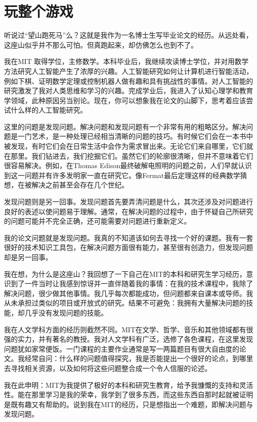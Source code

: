 \chapter{玩整个游戏}
听说过“望山跑死马”么？这就是我作为一名博士生写毕业论文的经历。从远处看，这座山似乎并不那么可怕。但真跑起来，却仿佛怎么也到不了。

我在MIT 取得学位，主修数学。本科毕业后，我继续攻读博士学位，并对用数学方法研究人工智能产生了浓厚的兴趣。人工智能研究如何让计算机进行智能活动，例如下棋、证明数学定理或控制机器人做有趣和具有挑战性的事情。对人工智能的研究激发了我对人类思维和学习的兴趣。完成学业后，我进入了认知心理学和教育学领域，此种原因另当别论。现在，你可以想象我在论文的山脚下，思考着应该尝试什么样的人工智能研究。

这里的问题是发现问题。解决问题和发现问题有一个非常有用的粗略区分。解决问题是一门艺术，是一种处理已经相当清晰的问题的技巧。有时候它们会在一本书中被发现，有时它们会在日常生活中会作为需求冒出来。无论它们来自哪里，它们就在那里。我们钻进去，我们挖掘它们。虽然它们的轮廓很清晰，但并不意味着它们很容易解决。例如，在Thomas Edison最终破解电照明的问题之前，人们早就认识到这一问题并有许多发明家一直在研究它。像Fermat最后定理这样的经典数学猜想，在被解决之前甚至会存在几个世纪。

发现问题则是另一回事。发现问题首先要弄清问题是什么，其次还涉及对问题进行良好的表述以使问题易于理解。通常，在解决问题的过程中，由于怀疑自己所研究的问题可能并不完全正确，还可能需要对问题进行重新定义。

我的论文问题就是发现问题。我真的不知道该如何去寻找一个好的课题。我有一套很好的技术知识工具包，在解决问题方面很有能力，甚至很有创造力，但发现问题却是另一回事。

我在想，为什么是这座山？我回想了一下自己在MIT的本科和研究生学习经历，意识到了一件当时让我感到惊讶并一直伴随着我的事情：在我的技术课程中，我除了解决问题，很少做其他事情。我几乎每次都能成功，但问题都来自课本或导师。我从未承担过类似的项目或开放式的研究。结果不可避免：我拥有大量解决问题的技能，却几乎没有发现问题的技能。

我在人文学科方面的经历则截然不同。MIT在文学、哲学、音乐和其他领域都有很强的实力，并有著名的教授。我对人文学科有广泛，选修了各色课程，在这里发现问题犹如家常便饭。一门课程的主要作业通常是写一两篇题目有很大自由度的论文。我经常自问：什么样的问题值得探究，我是否能提出一个很好的论点，到哪里去寻找相关资源，以及如何将这些问题整合成一个令人信服的论述。

我在此申明：MIT为我提供了极好的本科和研究生教育，给予我慷慨的支持和灵活性。能在那里学习是我的荣幸，我学到了很多东西，而这些东西自那时起就被证明是既有趣又有帮助的。说到我在MIT的经历，只是想指出一个难题，即解决问题与发现问题。

